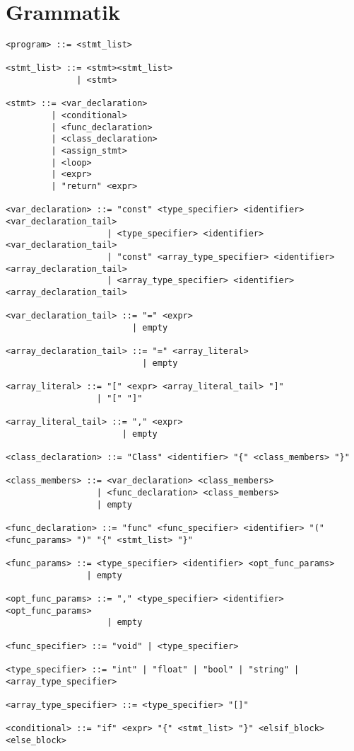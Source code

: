 \documentclass{TDP003mall}
\begin{document}
    \section{Grammatik}
\begin{verbatim}
<program> ::= <stmt_list>

<stmt_list> ::= <stmt><stmt_list>
              | <stmt>

<stmt> ::= <var_declaration> 
         | <conditional>
         | <func_declaration>
         | <class_declaration>
         | <assign_stmt>
         | <loop>
         | <expr>
         | "return" <expr>

<var_declaration> ::= "const" <type_specifier> <identifier> <var_declaration_tail>
                    | <type_specifier> <identifier> <var_declaration_tail>
                    | "const" <array_type_specifier> <identifier> <array_declaration_tail>
                    | <array_type_specifier> <identifier> <array_declaration_tail>

<var_declaration_tail> ::= "=" <expr>
                         | empty

<array_declaration_tail> ::= "=" <array_literal>
                           | empty

<array_literal> ::= "[" <expr> <array_literal_tail> "]"
                  | "[" "]"

<array_literal_tail> ::= "," <expr>
                       | empty

<class_declaration> ::= "Class" <identifier> "{" <class_members> "}"

<class_members> ::= <var_declaration> <class_members>
                  | <func_declaration> <class_members>
                  | empty

<func_declaration> ::= "func" <func_specifier> <identifier> "(" <func_params> ")" "{" <stmt_list> "}"

<func_params> ::= <type_specifier> <identifier> <opt_func_params>
                | empty

<opt_func_params> ::= "," <type_specifier> <identifier> <opt_func_params>
                    | empty

<func_specifier> ::= "void" | <type_specifier>

<type_specifier> ::= "int" | "float" | "bool" | "string" | <array_type_specifier>

<array_type_specifier> ::= <type_specifier> "[]"

<conditional> ::= "if" <expr> "{" <stmt_list> "}" <elsif_block> <else_block>


\end{verbatim}
\end{document}
